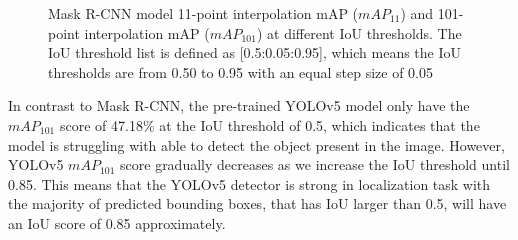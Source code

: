 \begin{figure}[!ht]
    \centering
    \quad
    \caption{Mask R-CNN model 11-point interpolation mAP ($mAP_{11}$) and 101-point interpolation mAP ($mAP_{101}$) at different IoU thresholds. The IoU threshold list is defined as [0.5:0.05:0.95], which means the IoU thresholds are from 0.50 to 0.95 with an equal step size of 0.05}  \label{fig:mrcnn_map}
\end{figure}

In contrast to Mask R-CNN, the pre-trained YOLOv5 model only have the $mAP_{101}$ score of 47.18\% at the IoU threshold of 0.5, which indicates that the model is struggling with able to detect the object present in the image. However, YOLOv5 $mAP_{101}$ score gradually decreases as we increase the IoU threshold until 0.85. This means that the YOLOv5 detector is strong in localization task with the majority of predicted bounding boxes, that has IoU larger than 0.5, will have an IoU score of 0.85 approximately.

